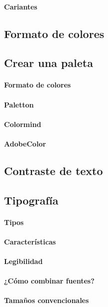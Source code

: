 \documentclass[12pt]{report}
\begin{document}
			\paragraph{Cariantes}
		\subsection{Formato de colores} %
		\subsection{Crear una paleta}
			\paragraph{Formato de colores}
			\paragraph{Paletton}
			\paragraph{Colormind}
			\paragraph{AdobeColor}
		\subsection{Contraste de texto}
		\subsection{Tipografía}
			\paragraph{Tipos}
			\paragraph{Características}
			\paragraph{Legibilidad}
			\paragraph{¿Cómo combinar fuentes?}
			\paragraph{Tamaños convencionales}
\end{document}
